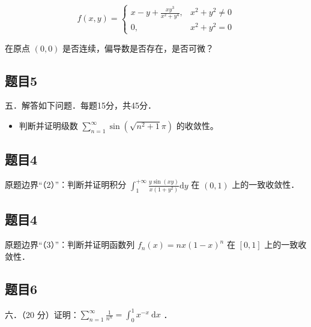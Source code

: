 \documentclass{article}
\begin{document}
\[
f(x, y)= \begin{cases}x-y+\frac{x y^{3}}{x^{2}+y^{4}}, & x^{2}+y^{2} \neq 0 \\ 0, & x^{2}+y^{2}=0\end{cases}
\]

在原点 \((0,0)\) 是否连续，偏导数是否存在，是否可微？

\subsection{题目5}
五．解答如下问题．每题15分，共45分．

\begin{itemize}
  \item[（1）] 判断并证明级数 \(\sum_{n=1}^{\infty} \sin \left(\sqrt{n^{2}+1} \pi\right)\) 的收敛性。
\end{itemize}

\subsection{题目4}
原题边界“（2）”：判断并证明积分 \(\int_{1}^{+\infty} \frac{y \sin (x y)}{x\left(1+y^{2}\right)} \mathrm{d} y\) 在 \((0,1)\) 上的一致收敛性．

\subsection{题目4}
原题边界“（3）”：判断并证明函数列 \(f_{n}(x)=n x(1-x)^{n}\) 在 \([0,1]\) 上的一致收敛性．

\subsection{题目6}
六．（20 分）证明：\(\sum_{n=1}^{\infty} \frac{1}{n^{n}}=\int_{0}^{1} x^{-x} \mathrm{~d} x\) ．
\end{document}
